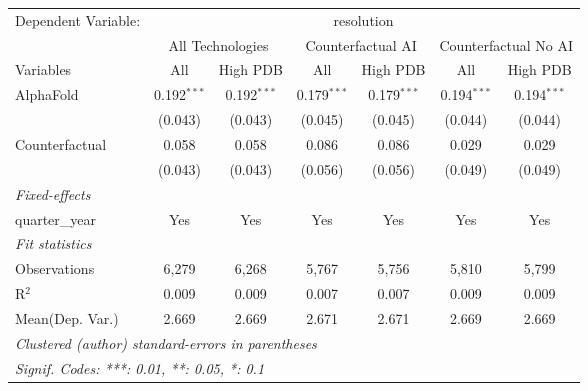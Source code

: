 \begingroup
\centering
\begin{tabular}{lcccccc}
   \tabularnewline \midrule \midrule
   Dependent Variable: & \multicolumn{6}{c}{resolution}\\
 & \multicolumn{2}{c}{All Technologies} & \multicolumn{2}{c}{Counterfactual AI} & \multicolumn{2}{c}{Counterfactual No AI} \\
\cmidrule(lr){1-1}\cmidrule(lr){2-3} \cmidrule(lr){4-5} \cmidrule(lr){6-7}
Variables & \multicolumn{1}{c}{All} & \multicolumn{1}{c}{High PDB} & \multicolumn{1}{c}{All} & \multicolumn{1}{c}{High PDB} & \multicolumn{1}{c}{All} & \multicolumn{1}{c}{High PDB} \\
\cmidrule(lr){1-1}\cmidrule(lr){2-2} \cmidrule(lr){3-3} \cmidrule(lr){4-4} \cmidrule(lr){5-5} \cmidrule(lr){6-6} \cmidrule(lr){7-7}
   AlphaFold      & 0.192$^{***}$ & 0.192$^{***}$ & 0.179$^{***}$ & 0.179$^{***}$ & 0.194$^{***}$ & 0.194$^{***}$\\   
                  & (0.043)       & (0.043)       & (0.045)       & (0.045)       & (0.044)       & (0.044)\\   
   Counterfactual & 0.058         & 0.058         & 0.086         & 0.086         & 0.029         & 0.029\\   
                  & (0.043)       & (0.043)       & (0.056)       & (0.056)       & (0.049)       & (0.049)\\   
   \midrule
   \emph{Fixed-effects}\\
   quarter\_year  & Yes           & Yes           & Yes           & Yes           & Yes           & Yes\\  
   \midrule
   \emph{Fit statistics}\\
   Observations   & 6,279         & 6,268         & 5,767         & 5,756         & 5,810         & 5,799\\  
   R$^2$          & 0.009         & 0.009         & 0.007         & 0.007         & 0.009         & 0.009\\  
Mean(Dep. Var.) & 2.669 & 2.669 & 2.671 & 2.671 & 2.669 & 2.669 \\
   \midrule \midrule
   \multicolumn{7}{l}{\emph{Clustered (author) standard-errors in parentheses}}\\
   \multicolumn{7}{l}{\emph{Signif. Codes: ***: 0.01, **: 0.05, *: 0.1}}\\
\end{tabular}
\par\endgroup
